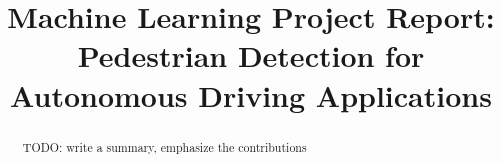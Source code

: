 \documentclass[10pt,twocolumn,letterpaper]{article}
\title{Machine Learning Project Report: \\
Pedestrian Detection for Autonomous Driving Applications}
\author{}
\begin{document}
\maketitle

\begin{abstract}
{TODO: write a summary, emphasize the contributions}
\end{abstract}






\end{document}
